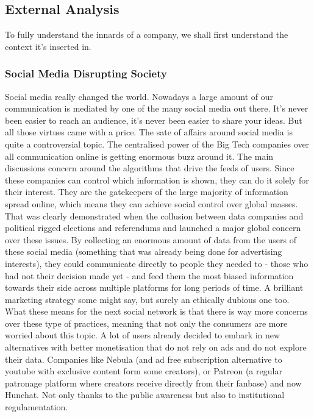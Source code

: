 \documentclass[12pt]{article}
\begin{document}
\subsection{External Analysis}

To fully understand the innards of a company, we shall first understand the context it's inserted in.
	
	\subsubsection{Social Media Disrupting Society}
	
	Social media really changed the world. Nowadays a large amount of our communication is mediated by one of the many social media out there. It's never been easier to reach an audience, it's never been easier to share your ideas. But all those virtues came with a price. The sate of affairs around social media is quite a controversial topic. The centralised power of the Big Tech companies over all communication online is getting enormous buzz around it. The main discussions concern around the algorithms that drive the feeds of users. Since these companies can control which information is shown, they can do it solely for their interest. They are the gatekeepers of the large majority of information spread online, which means they can achieve social control over global masses. That was clearly demonstrated when the collusion between data companies and political rigged elections and referendums and launched a major global concern over these issues. By collecting an enormous amount of data from the users of these social media (something that was already being done for advertising interests), they could communicate directly to people they needed to - those who had not their decision made yet - and feed them the most biased information towards their side across multiple platforms for long periods of time. A brilliant marketing strategy some might say, but surely an ethically dubious one too. What these means for the next social network is that there is way more concerns over these type of practices, meaning that not only the consumers are more worried about this topic. A lot of users already decided to embark in new alternatives with better monetisation that do not rely on ads and do not explore their data. Companies like Nebula (and ad free subscription alternative to youtube with exclusive content form some creators), or Patreon (a regular patronage platform where creators receive directly from their fanbase) and now Hunchat. Not only thanks to the public awareness but also to institutional regulamentation.
		
\end{document}
